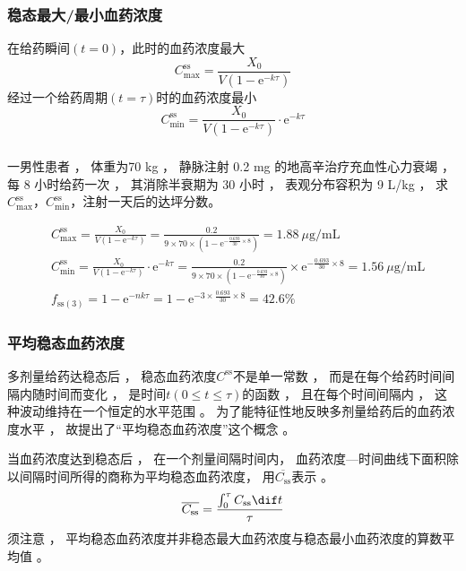 \documentclass[dvipsnames, svgnames, x11names]{beamer}
\begin{document}
\begin{frame}
	\frametitle{稳态最大/最小血药浓度}
	在给药瞬间$(t=0)$，此时的血药浓度最大
	\[
		C^\mathrm{ss}_\mathrm{max} = \frac{X_0}{V(1-\mathrm{e}^{-k\tau})}
	\]
	经过一个给药周期$(t=\tau)$时的血药浓度最小
	\[
		C^\mathrm{ss}_\mathrm{min} = \frac{X_0}{V(1-\mathrm{e}^{-k\tau})}\cdot \mathrm{e}^{-k\tau}
	\]
\end{frame}


\begin{frame}[t]
	\frametitle{}
	\begin{example}
		一男性患者 ， 体重为70 kg ， 静脉注射 0.2 mg 的地高辛治疗充血性心力衰竭 ， 每 8 小时给药一次 ， 其消除半衰期为 30 小时 ， 表观分布容积为 9 L/kg ， 求$C^\mathrm{ss}_\mathrm{max}$，$C^\mathrm{ss}_\mathrm{min}$，注射一天后的达坪分数。
	\end{example}
	\pause
	\[
		\begin{aligned}
			& C^\mathrm{ss}_\mathrm{max} = \frac{X_0}{V(1-\mathrm{e}^{-k\tau})} = \frac{0.2}{9\times 70\times (1-\mathrm{e}^{-\frac{0.693}{30}\times 8})} = 1.88 \ \mu \mathrm{g/mL} \\
			& C^\mathrm{ss}_\mathrm{min} = \frac{X_0}{V(1-\mathrm{e}^{-k\tau})}\cdot \mathrm{e}^{-k\tau} = \frac{0.2}{9\times 70\times (1-\mathrm{e}^{-\frac{0.693}{30}\times 8})}\times  \mathrm{e}^{-\frac{0.693}{30}\times 8}= 1.56 \ \mu \mathrm{g/mL} \\
			& f_\mathrm{ss(3)} = 1-\mathrm{e}^{-nk\tau} = 1-\mathrm{e}^{-3\times \frac{0.693}{30}\times 8} = 42.6\%
		\end{aligned}
	\]
\end{frame}


\begin{frame}
	\frametitle{平均稳态血药浓度}
	多剂量给药达稳态后 ， 稳态血药浓度$C^\mathrm{ss}$不是单一常数 ， 而是在每个给药时间间隔内随时间而变化 ， 是时间$t(0\leqslant    t\leqslant \tau)$的函数 ， 且在每个时间间隔内 ， 这种波动维持在一个恒定的水平范围 。 为了能特征性地反映多剂量给药后的血药浓度水平 ， 故提出了“平均稳态血药浓度”这个概念 。
	
	当血药浓度达到稳态后 ， 在一个剂量间隔时间内， 血药浓度---时间曲线下面积除以间隔时间所得的商称为平均稳态血药浓度， 用$\overline{C_\mathrm{ss}}$表示 。
	\[
		\overline{C_\mathrm{ss}} = \frac{\int_0^\tau C_\mathrm{ss}\dif t}{\tau}
	\]
	须注意 ， 平均稳态血药浓度并非稳态最大血药浓度与稳态最小血药浓度的算数平均值 。
\end{frame}
\end{document}
